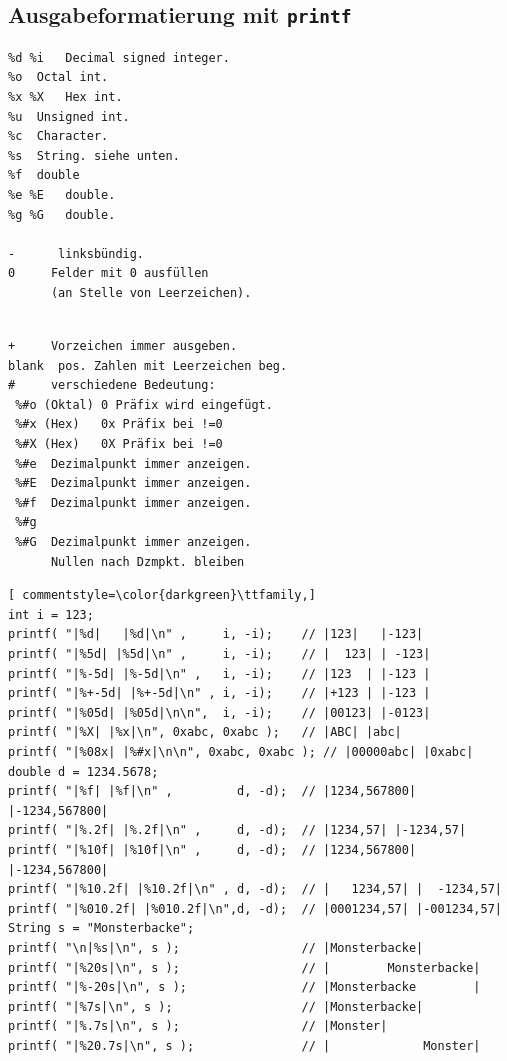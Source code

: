 \documentclass[10pt,a4paper,ngerman,oneside,]{article}
\begin{document}
\subsection{Ausgabeformatierung mit \texttt{printf}}
\begin{multicols}{2}
\begin{verbatim}
%d %i	Decimal signed integer.
%o	Octal int.
%x %X	Hex int.
%u	Unsigned int.
%c	Character.
%s	String.	siehe unten.
%f	double
%e %E	double.
%g %G	double.

-      linksbündig.
0  	  Felder mit 0 ausfüllen 
      (an Stelle von Leerzeichen).
\end{verbatim}
\columnbreak
\begin{verbatim}

+	  Vorzeichen immer ausgeben.
blank  pos. Zahlen mit Leerzeichen beg.
# 	  verschiedene Bedeutung:
 %#o (Oktal) 0 Präfix wird eingefügt.
 %#x (Hex)   0x Präfix bei !=0
 %#X (Hex)   0X Präfix bei !=0
 %#e  Dezimalpunkt immer anzeigen.
 %#E  Dezimalpunkt immer anzeigen.
 %#f  Dezimalpunkt immer anzeigen.
 %#g  
 %#G  Dezimalpunkt immer anzeigen. 
      Nullen nach Dzmpkt. bleiben
\end{verbatim}
\end{multicols}
\begin{lstlisting}[	commentstyle=\color{darkgreen}\ttfamily,]
int i = 123;
printf( "|%d|   |%d|\n" ,     i, -i);    // |123|   |-123|
printf( "|%5d| |%5d|\n" ,     i, -i);    // |  123| | -123|
printf( "|%-5d| |%-5d|\n" ,   i, -i);    // |123  | |-123 |
printf( "|%+-5d| |%+-5d|\n" , i, -i);    // |+123 | |-123 |
printf( "|%05d| |%05d|\n\n",  i, -i);    // |00123| |-0123|
printf( "|%X| |%x|\n", 0xabc, 0xabc );   // |ABC| |abc|
printf( "|%08x| |%#x|\n\n", 0xabc, 0xabc ); // |00000abc| |0xabc|
double d = 1234.5678;
printf( "|%f| |%f|\n" ,         d, -d);  // |1234,567800| |-1234,567800|
printf( "|%.2f| |%.2f|\n" ,     d, -d);  // |1234,57| |-1234,57|
printf( "|%10f| |%10f|\n" ,     d, -d);  // |1234,567800| |-1234,567800|
printf( "|%10.2f| |%10.2f|\n" , d, -d);  // |   1234,57| |  -1234,57|
printf( "|%010.2f| |%010.2f|\n",d, -d);  // |0001234,57| |-001234,57|
String s = "Monsterbacke";
printf( "\n|%s|\n", s );                 // |Monsterbacke|
printf( "|%20s|\n", s );                 // |        Monsterbacke|
printf( "|%-20s|\n", s );                // |Monsterbacke        |
printf( "|%7s|\n", s );                  // |Monsterbacke|
printf( "|%.7s|\n", s );                 // |Monster|
printf( "|%20.7s|\n", s );               // |             Monster|
\end{lstlisting}
\end{document}
